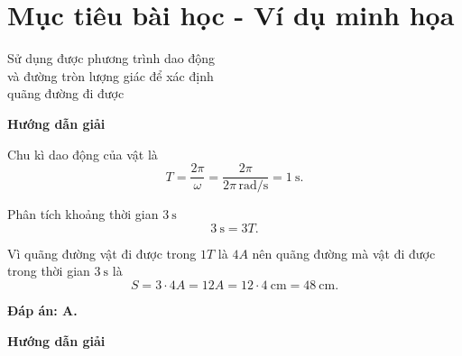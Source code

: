 \section{Mục tiêu bài học - Ví dụ minh họa}
\begin{dang}{Sử dụng được phương trình dao động\\ và đường tròn lượng giác để xác định\\ quãng đường đi được}
	{\begin{center}
			\textbf{Hướng dẫn giải}
		\end{center}
		
		Chu kì dao động của vật là
		\begin{equation*}
			T=\dfrac{2\pi}{\omega}=\dfrac{2\pi}{2\pi\,\text{rad/s}}=\SI{1}{\second}.
		\end{equation*}
		
		Phân tích khoảng thời gian $\SI{3}{\second}$
		\begin{equation*}
			\SI{3}{\second}=3T.
		\end{equation*}
		
		Vì quãng đường vật đi được trong $1T$ là $4A$ nên quãng đường mà vật đi được trong thời gian $\SI{3}{\second}$ là
		\begin{equation*}
			S=3\cdot4A=12A=12\cdot\SI{4}{\centi\meter}=\SI{48}{\centi\meter}.
		\end{equation*}
		
		\textbf{Đáp án: A.}
	}
	{\begin{center}
			\textbf{Hướng dẫn giải}
		\end{center}
		
}
\end{dang}
